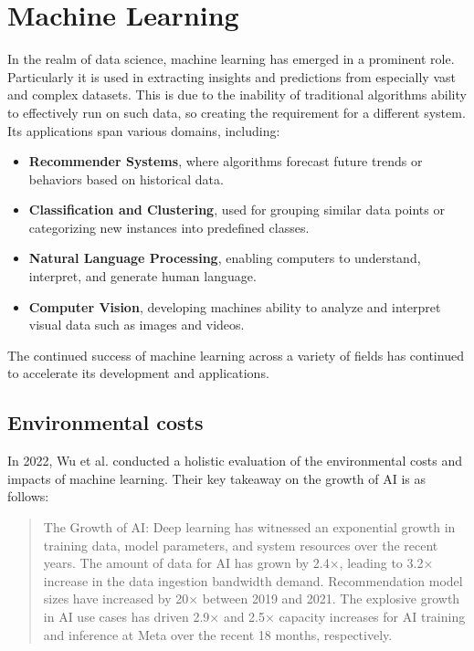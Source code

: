 \documentclass{l4proj}
\begin{document}
\section{Machine Learning}


In the realm of data science, machine learning has emerged in a prominent role. Particularly it is used in extracting insights and predictions from especially vast and complex datasets. This is due to the inability of traditional algorithms ability to effectively run on such data, so creating the requirement for a different system. Its applications span various domains, including:
\\
\begin{itemize}
    \item \textbf{Recommender Systems}, where algorithms forecast future trends or behaviors based on historical data.
    \item \textbf{Classification and Clustering}, used for grouping similar data points or categorizing new instances into predefined classes. 
    \item \textbf{Natural Language Processing}, enabling computers to understand, interpret, and generate human language. 
    \item \textbf{Computer Vision}, developing machines ability to analyze and interpret visual data such as images and videos. \\
\end{itemize}
The continued success of machine learning across a variety of fields has continued to accelerate its development and applications. \\

\subsection{Environmental costs}

In 2022, Wu et al. conducted a holistic evaluation of the environmental costs and impacts of machine learning. Their key takeaway on the growth of AI is as follows: \\

\begin{quote}
    The Growth of AI: Deep learning has witnessed an exponential growth in training data, model parameters, and system resources over the recent years. The amount of data for AI has grown by 2.4×, leading to 3.2× increase in the data ingestion bandwidth demand. Recommendation model sizes have increased by 20× between 2019 and 2021. The explosive growth in AI use cases has driven 2.9× and 2.5× capacity increases for AI training and inference at Meta over the recent 18 months, respectively. \\
\end{quote}
\end{document}
